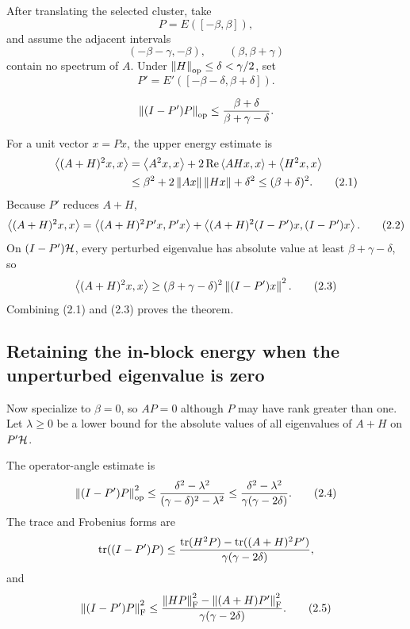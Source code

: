 After translating the selected cluster, take
\[
  P=E([-\beta,\beta]),
\]
and assume the adjacent intervals
\[
  (-\beta-\gamma,-\beta),\qquad(\beta,\beta+\gamma)
\]
contain no spectrum of $A$. Under $\left\lVert H\right\rVert_{\mathrm{op}}\le\delta<\gamma/2$, set
\[
  P'=E'([-\beta-\delta,\beta+\delta]).
\]

\begin{theorem}[Davis 2.1]
\[
  \left\lVert (I-P')P\right\rVert_{\mathrm{op}}
  \le
  \frac{\beta+\delta}{\beta+\gamma-\delta}.
\]
\end{theorem}

For a unit vector $x=Px$, the upper energy estimate is
\begin{align}
  \left\langle (A+H)^2x,x\right\rangle
  &=\left\langle A^2x,x\right\rangle+2\operatorname{Re}\left\langle AHx,x\right\rangle+\left\langle H^2x,x\right\rangle\notag\\
  &\le \beta^2+2\left\lVert Ax\right\rVert\left\lVert Hx\right\rVert+\delta^2
  \le(\beta+\delta)^2. \tag{2.1}
\end{align}
Because $P'$ reduces $A+H$,
\begin{equation}
  \left\langle (A+H)^2x,x\right\rangle
  =\left\langle (A+H)^2P'x,P'x\right\rangle
   +\left\langle (A+H)^2(I-P')x,(I-P')x\right\rangle. \tag{2.2}
\end{equation}
On $(I-P')\mathcal{H}$, every perturbed eigenvalue has absolute value at least $\beta+\gamma-\delta$, so
\begin{equation}
  \left\langle (A+H)^2x,x\right\rangle
  \ge(\beta+\gamma-\delta)^2\left\lVert (I-P')x\right\rVert^2. \tag{2.3}
\end{equation}
Combining (2.1) and (2.3) proves the theorem.

\subsection{Retaining the in-block energy when the unperturbed eigenvalue is zero}

Now specialize to $\beta=0$, so $AP=0$ although $P$ may have rank greater than one. Let $\lambda\ge0$ be a lower bound for the absolute values of all eigenvalues of $A+H$ on $P'\mathcal{H}$.

\begin{theorem}[Davis 2.2]
The operator-angle estimate is
\begin{equation}
  \left\lVert (I-P')P\right\rVert_{\mathrm{op}}^2
  \le
  \frac{\delta^2-\lambda^2}{(\gamma-\delta)^2-\lambda^2}
  \le
  \frac{\delta^2-\lambda^2}{\gamma(\gamma-2\delta)}. \tag{2.4}
\end{equation}
The trace and Frobenius forms are
\[
  \operatorname{tr}((I-P')P)
  \le
  \frac{\operatorname{tr}(H^2P)-\operatorname{tr}((A+H)^2P')}{\gamma(\gamma-2\delta)},
\]
and
\begin{equation}
  \left\lVert (I-P')P\right\rVert_{\mathrm{F}}^2
  \le
  \frac{\left\lVert HP\right\rVert_{\mathrm{F}}^2-\left\lVert (A+H)P'\right\rVert_{\mathrm{F}}^2}
       {\gamma(\gamma-2\delta)}. \tag{2.5}
\end{equation}
\end{theorem}

